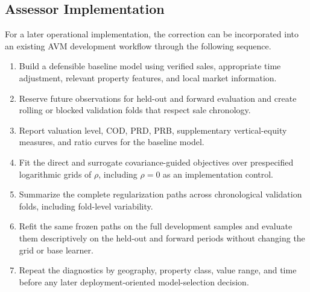 \documentclass[10pt]{article}
\theoremstyle{definition}
\newcommand{\1}{\mathbf{1}}
\newcommand{\oldtext}[1]{\textcolor{blue}{\sout{#1}}}
\newcommand{\newtext}[1]{\textcolor{impGreen}{#1}}
\begin{document}
\subsection{Assessor Implementation}
\label{sec:implementation_workflow}

\newtext{For a later operational implementation, the correction can be incorporated into an existing AVM development workflow through the following sequence.}

\begin{enumerate}[leftmargin=7mm]
    \item Build a defensible baseline model using verified sales, appropriate time adjustment, relevant property features, and local market information.
    \item Reserve future observations for held-out and forward evaluation and create rolling or blocked validation folds that respect sale chronology.
    \item Report valuation level, COD, PRD, PRB, supplementary vertical-equity measures, and ratio curves for the baseline model.
    \item Fit the direct and surrogate covariance-guided objectives over prespecified logarithmic grids of $\rho$, including $\rho=0$ as an implementation control.
    \item Summarize the complete regularization paths across chronological validation folds, including fold-level variability.
    \item Refit the same frozen paths on the full development samples and evaluate them descriptively on the held-out and forward periods without changing the grid or base learner.
    \item Repeat the diagnostics by geography, property class, value range, and time before any later deployment-oriented model-selection decision.
\end{enumerate}
\end{document}
